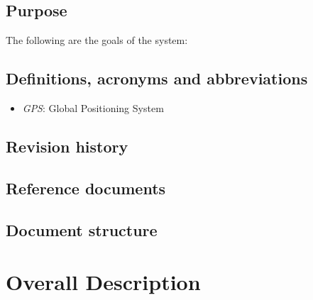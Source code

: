 \documentclass[a4paper]{report}
\begin{document}
\section{Purpose}
The following are the goals of the system:

\section{Definitions, acronyms and abbreviations}
\begin{itemize}
\item \textit{GPS}: Global Positioning System
\end{itemize}
\section{Revision history}
\lipsum[1]
\section{Reference documents}
\lipsum[1]
\section{Document structure}
\lipsum[1]

\chapter{Overall Description}
\end{document}
